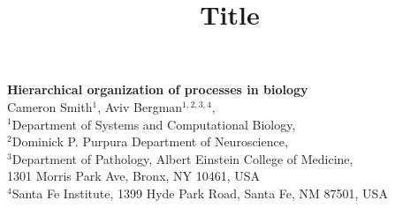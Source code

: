 




\let\ref\autoref


\title{Title}

\begin{center}
{\Large
\textbf{Hierarchical organization of processes in biology}
}
\\[.5cm]
Cameron Smith$^{1}$,
Aviv Bergman$^{1,2,3,4}$,
\\[.5cm]
$^1$Department of Systems and Computational Biology,\\
$^2$Dominick P. Purpura Department of Neuroscience,\\
$^3$Department of Pathology, Albert Einstein College of Medicine,\\
1301 Morris Park Ave, Bronx, NY 10461, USA\\
$^4$Santa Fe Institute, 1399 Hyde Park Road, Santa Fe, NM 87501, USA
\end{center}


